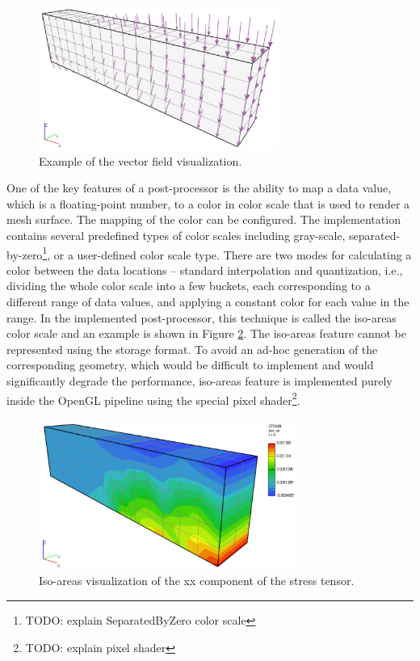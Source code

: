 \begin{figure}[H]
    \centering
    \includegraphics[width=0.7\textwidth]{figures/chapter-data-management/beam-vectors}
    \decoRule
    \caption{Example of the vector field visualization.}
    \label{fig:beam-vectors}
\end{figure}

One of the key features of a post-processor is the ability to map a data value, which is a floating-point number, to a color in color scale that is used to render a mesh surface. The mapping of the color can be configured. The implementation contains several predefined types of color scales including gray-scale, separated-by-zero\footnote{TODO: explain SeparatedByZero color scale}, or a user-defined color scale type. There are two modes for calculating a color between the data locations -- standard interpolation and quantization, i.e., dividing the whole color scale into a few buckets, each corresponding to a different range of data values, and applying a constant color for each value in the range. In the implemented post-processor, this technique is called the iso-areas color scale and an example is shown in Figure \ref{fig:beam-isoareas-shader}. The iso-areas feature cannot be represented using the storage format. To avoid an ad-hoc generation of the corresponding geometry, which would be difficult to implement and would significantly degrade the performance, iso-areas feature is implemented purely inside the OpenGL pipeline using the special pixel shader\footnote{TODO: explain pixel shader}.


\begin{figure}[H]
    \centering
    \includegraphics[width=0.75\textwidth]{figures/chapter-data-management/beam-isoareas-shader}
    \decoRule
    \caption{Iso-areas visualization of the xx component of the stress tensor.}
    \label{fig:beam-isoareas-shader}
\end{figure}


